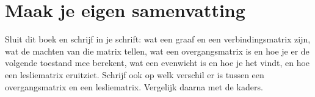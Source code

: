 
\ifzelfstudie
\section*{Maak je eigen samenvatting}
Sluit dit boek en schrijf in je schrift: wat een graaf en een verbindingsmatrix zijn, wat de machten van die matrix tellen, wat een overgangsmatrix is en hoe je er de volgende toestand mee berekent, wat een evenwicht is en hoe je het vindt, en hoe een lesliematrix eruitziet. Schrijf ook op welk verschil er is tussen een overgangsmatrix en een lesliematrix. Vergelijk daarna met de kaders.
\fi
